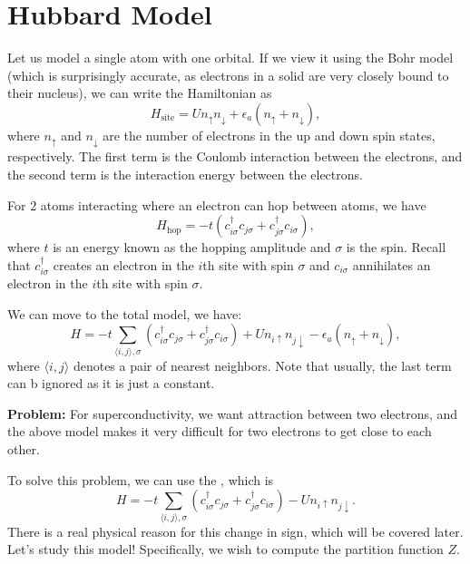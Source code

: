 \documentclass{article}
\numberwithin{equation}{section}
\begin{document}
    \section{Hubbard Model}
    Let us model a single atom with one orbital. If we view it using the Bohr model (which is surprisingly accurate, as electrons in a solid are very closely bound to their nucleus), we can write the Hamiltonian as 
    \begin{equation}
        H_\text{site}= Un_\uparrow n_\downarrow + \epsilon_a(n_\uparrow + n_\downarrow),
    \end{equation}
    where $n_\uparrow$ and $n_\downarrow$ are the number of electrons in the up and down spin states, respectively. The first term is the Coulomb interaction between the electrons, and the second term is the interaction energy between the electrons. 
    
    For 2 atoms interacting where an electron can hop between atoms, we have 
    \begin{equation}
        H_\text{hop} = -t(c_{i\sigma}^\dagger c_{j\sigma} + c_{j\sigma}^\dagger c_{i\sigma}),
    \end{equation}
    where $t$ is an energy known as the hopping amplitude and $\sigma$ is the spin. Recall that $c_{i\sigma}^\dagger$ creates an electron in the $i$th site with spin $\sigma$ and $c_{i\sigma}$ annihilates an electron in the $i$th site with spin $\sigma.$

    We can move to the total model, we have:
    \begin{equation}
        H = -t\sum_{\langle i,j\rangle, \sigma}(c_{i\sigma}^\dagger c_{j\sigma} + c_{j\sigma}^\dagger c_{i\sigma}) + Un_{i\uparrow} n_{j\downarrow} - \epsilon_a(n_\uparrow + n_\downarrow),
    \end{equation}
    where $\langle i,j\rangle$ denotes a pair of nearest neighbors. Note that usually, the last term can b ignored as it is just a constant.

    \textbf{Problem:} For superconductivity, we want attraction between two electrons, and the above model makes it very difficult for two electrons to get close to each other.

    To solve this problem, we can use the , which is
    \begin{equation}
        H = -t\sum_{\langle i,j\rangle, \sigma}(c_{i\sigma}^\dagger c_{j\sigma} + c_{j\sigma}^\dagger c_{i\sigma}) - Un_{i\uparrow} n_{j\downarrow}.
    \end{equation}
    There is a real physical reason for this change in sign, which will be covered later. Let's study this model! Specifically, we wish to compute the partition function $Z.$
\end{document}
